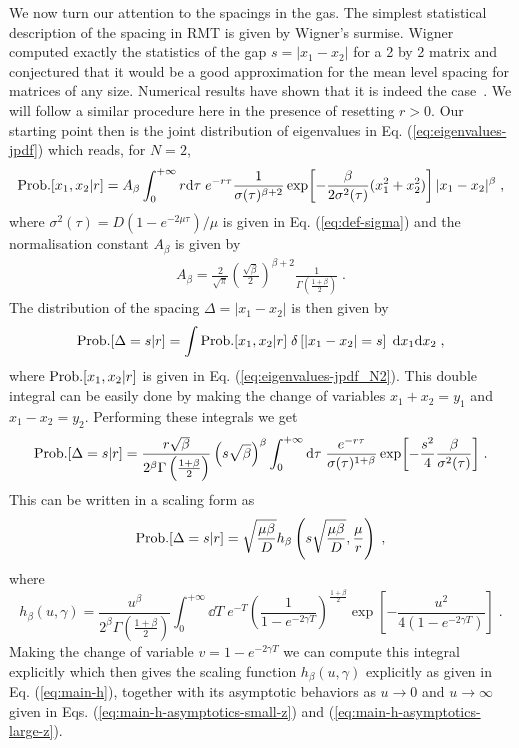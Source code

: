 \documentclass[onecolumn,superscriptaddress,
 amsmath,amssymb,
 aps,
 prd,
]{revtex4-1}
\newcommand{\bea}{\begin{eqnarray}}
\newcommand{\eea}{\end{eqnarray}}
\begin{document}
We now turn our attention to the spacings in the gas. The simplest statistical description of the spacing in RMT is given by Wigner's surmise. Wigner computed exactly the statistics of the gap $s = |x_1 - x_2|$ for a 2 by 2 matrix and conjectured that it would be a good approximation for the mean level spacing for matrices of any size. Numerical results have shown that it is indeed the case~\cite{M91}. We will follow a similar procedure here in the presence of resetting $r>0$. Our starting point then is the joint distribution of eigenvalues in Eq. (\ref{eq:eigenvalues-jpdf}) which reads, for $N=2$, 
\begin{equation} \label{eq:eigenvalues-jpdf_N2}
{\rm Prob.}[x_1, x_2 | r ] = A_\beta \int_0^{+\infty} r \dd\tau\; e^{-r\tau} \frac{1}{\sigma(\tau)^{\beta + 2}} \exp[ -\frac{\beta}{2\sigma^2(\tau)} (x_1^2 + x_2^2) ] \, |x_1-x_2|^\beta\;,
\end{equation}
where $\sigma^2(\tau) = D(1-e^{-2\mu \tau})/\mu$ is given in Eq. (\ref{eq:def-sigma}) and the normalisation constant $A_\beta$ is given by
\bea \label{Ab}
A_\beta = \frac{2}{\sqrt{\pi}}\left(\frac{\sqrt{\beta}}{2} \right)^{\beta + 2} \frac{1}{\Gamma\left( \frac{1+\beta}{2}\right)} \;.
\eea 
The distribution of the spacing $\Delta = |x_1 - x_2|$ is then given by
\bea \label{p_gap1}
{\rm Prob.}[\Delta = s \vert r] = \int {\rm Prob.}[x_1, x_2 | r ] \; \delta \left[ |x_1-x_2| = s\right] \; \dd x_1 \dd x_2 \;,
\eea
where ${\rm Prob.}[x_1, x_2 | r ]$ is given in Eq. (\ref{eq:eigenvalues-jpdf_N2}). This double integral can be easily done by making the change of variables $x_1+x_2 = y_1$ and $x_1 - x_2 = y_2$. Performing these integrals we get  
{
\begin{equation} \label{eq:renewal-s}
{\rm Prob.}[\Delta = s | r] = \frac{r \sqrt{\beta} }{2^\beta \Gamma\left(\frac{1 + \beta}{2} \right)} \left(s \sqrt{\beta} \right)^\beta  \int_0^{+\infty} \dd \tau \; \frac{e^{-r \tau}}{\sigma(\tau)^{1 + \beta}}  \exp[ - \frac{s^2}{4} \frac{\beta}{\sigma^2(\tau)} ]  \;.
\end{equation}
}
This can be written in a scaling form as
{
\begin{equation} \label{eq:s-scaling}
{\rm Prob.}[\Delta =s \vert r] = \sqrt{\frac{\mu \beta}{D}} h_\beta\left( s \sqrt{\frac{\mu \beta}{D}}, \frac{\mu}{r}  \right) \;,
\end{equation}
}
where 
\begin{equation} \label{eq:h-def}
h_\beta(u, \gamma) = \frac{u^\beta}{2^\beta \Gamma\left(\frac{1 + \beta}{2} \right)} \int_0^{+\infty} \dd T \; e^{-T} \left(\frac{1}{1 - e^{-2\gamma T}}\right)^{\frac{1+\beta}{2}} \exp[ - \frac{u^2}{4(1 - e^{-2\gamma T})}] \;.
\end{equation}
Making the change of variable $v = 1 - e^{-2 \gamma T}$ we can compute this integral explicitly which then gives the scaling function $h_\beta(u,\gamma)$ explicitly as given in Eq. (\ref{eq:main-h}), together with its asymptotic behaviors as $u \to 0$ and $u \to \infty$ given in Eqs. (\ref{eq:main-h-asymptotics-small-z}) and (\ref{eq:main-h-asymptotics-large-z}).  
\end{document}
